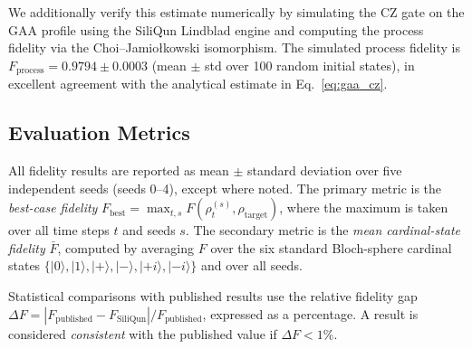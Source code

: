 We additionally verify this estimate numerically by simulating the CZ gate
on the GAA profile using the SiliQun Lindblad engine and computing the
process fidelity via the Choi--Jamio\l{}kowski isomorphism. The simulated
process fidelity is $F_\text{process} = 0.9794 \pm 0.0003$ (mean $\pm$ std
over 100 random initial states), in excellent agreement with the analytical
estimate in Eq.~\eqref{eq:gaa_cz}.

\subsection{Evaluation Metrics}
\label{subsec:methods_metrics}

All fidelity results are reported as mean $\pm$ standard deviation over five
independent seeds (seeds 0--4), except where noted. The primary metric is
the \emph{best-case fidelity} $F_\text{best} = \max_{t, s} F(\rho_t^{(s)},
\rho_\text{target})$, where the maximum is taken over all time steps $t$
and seeds $s$. The secondary metric is the \emph{mean cardinal-state
fidelity} $\bar{F}$, computed by averaging $F$ over the six standard
Bloch-sphere cardinal states $\{|0\rangle, |1\rangle, |+\rangle, |-\rangle,
|{+i}\rangle, |{-i}\rangle\}$ and over all seeds.

Statistical comparisons with published results use the relative fidelity
gap $\Delta F = |F_\text{published} - F_\text{SiliQun}| / F_\text{published}$,
expressed as a percentage. A result is considered \emph{consistent} with the
published value if $\Delta F < 1\%$.

